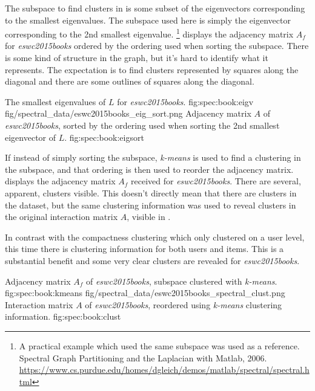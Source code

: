 The subspace to find clusters in is some subset of the eigenvectors corresponding to the smallest eigenvalues. The subspace used here is simply the eigenvector corresponding to the 2nd smallest eigenvalue. 
\footnote{A practical example which used the same subspace was used as a reference. \\
Spectral Graph Partitioning and the Laplacian with Matlab, 2006. \\
\url{https://www.cs.purdue.edu/homes/dgleich/demos/matlab/spectral/spectral.html}
}
 displays the adjacency matrix $A_f$ for \textit{eswc2015books} ordered by the ordering used when sorting the subspace. There is some kind of structure in the graph, but it's hard to identify what it represents. The expectation is to find clusters represented by squares along the diagonal and there are some outlines of squares along the diagonal.

\FloatBarrier

{The smallest eigenvalues of $L$ for \textit{eswc2015books}.}
{fig:spec:book:eigv}
{fig/spectral_data/eswc2015books_eig_sort.png}
{Adjacency matrix $A$ of \textit{eswc2015books}, sorted by the ordering used when sorting the 2nd smallest eigenvector of $L$.}
{fig:spec:book:eigsort}

\FloatBarrier

If instead of simply sorting the subspace, \textit{k-means} is used to find a clustering in the subspace, and that ordering is then used to reorder the adjacency matrix.  displays the adjacency matrix $A_f$ received for \textit{eswc2015books}. There are several, apparent, clusters visible. This doesn't directly mean that there are clusters in the dataset, but the same clustering information was used to reveal clusters in the original interaction matrix $A$, visible in .

In contrast with the compactness clustering which only clustered on a user level, this time there is clustering information for both users and items. This is a substantial benefit and some very clear clusters are revealed for \textit{eswc2015books}.

\FloatBarrier

{Adjacency matrix $A_f$ of \textit{eswc2015books}, subspace clustered with \textit{k-means}.}
{fig:spec:book:kmeans}
{fig/spectral_data/eswc2015books_spectral_clust.png}
{Interaction matrix $A$ of \textit{eswc2015books}, reordered using \textit{k-means} clustering information.}
{fig:spec:book:clust}

